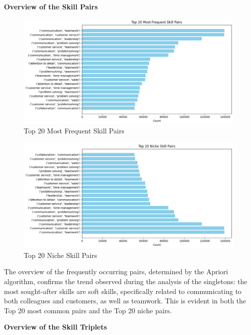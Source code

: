 \documentclass{article}
\begin{document}
\vspace{0.5cm}
\textbf{Overview of the Skill Pairs}

\vspace{0.3cm}
\begin{figure}[H]
    \centering
    \includegraphics[width=0.9\linewidth]{download (24).png}
    \caption{Top 20 Most Frequent Skill Pairs}
    \label{fig:skill_pairs_1}
\end{figure}

\vspace{0.3cm}
\begin{figure}[H]
    \centering
    \includegraphics[width=0.9\linewidth]{download (25).png}
    \caption{Top 20 Niche Skill Pairs}
    \label{fig:skill_pairs_2}
\end{figure}

\vspace{0.3cm}
The overview of the frequently occurring pairs, determined by the Apriori algorithm, confirms the trend observed during the analysis of the singletons: the most sought-after skills are soft skills, specifically related to communicating to both colleagues and customers, as well as teamwork. This is evident in both the Top 20 most common pairs and the Top 20 niche pairs.

\vspace{0.5cm}
\textbf{Overview of the Skill Triplets}
\end{document}

